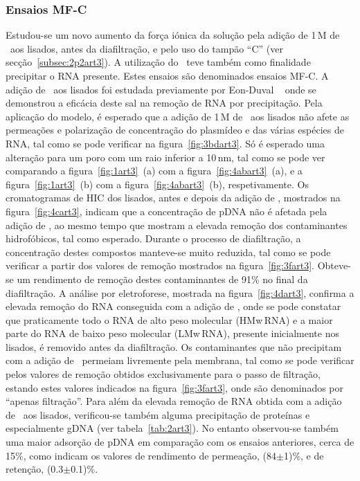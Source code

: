 \subsubsection{Ensaios MF-C}
\label{subsubsec:3p1p4art3}
%
Estudou-se um novo aumento da força iónica da solução pela adição de 1\,M de \cacldois\ aos lisados, antes da diafiltração, e pelo uso do tampão ``C'' (ver secção~\ref{subsec:2p2art3}).
%
%
A utilização do \cacldois\ teve também como finalidade precipitar o RNA presente. Estes ensaios são denominados ensaios MF-C. A adição de \cacldois\ aos lisados foi estudada previamente por Eon-Duval \et\ \cite{duvaltff,duval2} onde se demonstrou a eficácia deste sal na remoção de RNA por precipitação.
%
Pela aplicação do modelo, é esperado que a adição de 1\,M de \cacldois\ aos lisados não afete as permeações e polarização de concentração do plasmídeo e das várias espécies de RNA, tal como se pode verificar na figura~\ref{fig:3bdart3}. Só é esperado uma alteração para um poro com um raio inferior a 10\,nm, tal como se pode ver comparando a figura~\ref{fig:1art3}~(a) com a figura~\ref{fig:4abart3}~(a), e a figura~\ref{fig:1art3}~(b) com a figura~\ref{fig:4abart3}~(b), respetivamente. Os cromatogramas de HIC dos lisados, antes e depois da adição de \cacldois, mostrados na figura~\ref{fig:4cart3}, indicam que a concentração de pDNA não é afetada pela adição de \cacldois, ao mesmo tempo que mostram a elevada remoção dos contaminantes hidrofóbicos, tal como esperado.
%
Durante o processo de diafiltração, a concentração destes compostos manteve-se muito reduzida, tal como se pode verificar a partir dos valores de remoção mostrados na figura~\ref{fig:3fart3}. Obteve-se um rendimento de remoção destes contaminantes de 91\% no final da diafiltração.
%
A análise por eletroforese, mostrada na figura~\ref{fig:4dart3}, confirma a elevada remoção do RNA conseguida com a adição de \cacldois, onde se pode constatar que praticamente todo o RNA de alto peso molecular (HMw\,RNA) e a maior parte do RNA de baixo peso molecular (LMw\,RNA), presente inicialmente nos lisados, é removido antes da diafiltração.
%
Os contaminantes que não precipitam com a adição de \cacldois\ permeiam livremente pela membrana, tal como se pode verificar pelos valores de remoção obtidos exclusivamente para o passo de filtração, estando estes valores indicados na figura~\ref{fig:3fart3}, onde são denominados por ``apenas filtração''. Para além da elevada remoção de RNA obtida com a adição de \cacldois\ aos lisados, verificou-se também alguma precipitação de proteínas e especialmente gDNA (ver tabela~\ref{tab:2art3}). No entanto observou-se também uma maior adsorção de pDNA em comparação com os ensaios anteriores, cerca de 15\%, como indicam os valores de rendimento de permeação, (84$\pm$1)\%, e de retenção, (0.3$\pm$0.1)\%.
